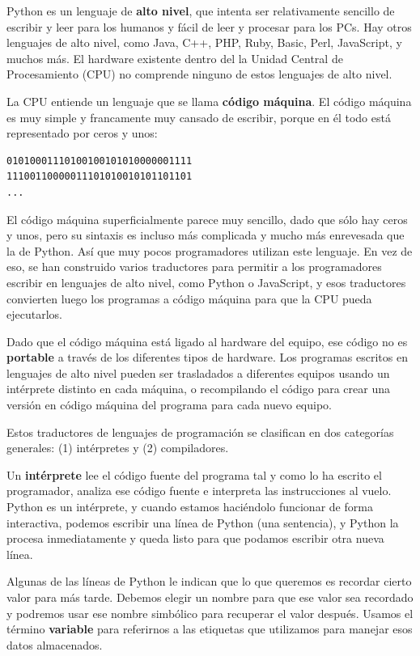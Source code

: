 Python es un lenguaje de {\bf alto nivel}, que intenta ser relativamente
sencillo de escribir y leer para los humanos y fácil de leer y procesar para
los PCs. Hay otros lenguajes de alto nivel, como Java, C++,
PHP, Ruby, Basic, Perl, JavaScript, y muchos más. El hardware existente
dentro del la Unidad Central de Procesamiento (CPU) no comprende
ninguno de estos lenguajes de alto nivel.

La CPU entiende un lenguaje que se llama {\bf código máquina}. El código
máquina es muy simple y francamente muy cansado de escribir, porque
en él todo está representado por ceros y unos:

\beforeverb
\begin{verbatim}
01010001110100100101010000001111
11100110000011101010010101101101
...
\end{verbatim}
\afterverb
%
El código máquina superficialmente parece muy sencillo, dado que sólo hay
ceros y unos, pero su sintaxis es incluso más complicada
y mucho más enrevesada que la de Python. Así que muy pocos programadores
utilizan este lenguaje. En vez de eso, se han construido varios traductores para
permitir a los programadores escribir en lenguajes de alto nivel, como Python
o JavaScript, y esos traductores convierten luego los programas a código máquina
para que la CPU pueda ejecutarlos.

Dado que el código máquina está ligado al hardware del equipo, ese código
no es {\bf portable} a través de los diferentes tipos de hardware. Los programas escritos
en lenguajes de alto nivel pueden ser trasladados a diferentes equipos usando
un intérprete distinto en cada máquina, o recompilando el código para crear
una versión en código máquina del programa para cada nuevo equipo.

Estos traductores de lenguajes de programación se clasifican en dos categorías generales:
(1) intérpretes y (2) compiladores.

Un {\bf intérprete} lee el código fuente del programa tal y como lo ha escrito
el programador, analiza ese código fuente e interpreta las instrucciones al vuelo.
Python es un intérprete, y cuando estamos haciéndolo funcionar de forma interactiva,
podemos escribir una línea de Python (una sentencia), y Python la procesa inmediatamente
y queda listo para que podamos escribir otra nueva línea.

Algunas de las líneas de Python le indican que lo que queremos es recordar cierto
valor para más tarde. Debemos elegir un nombre para que ese valor sea recordado y
podremos usar ese nombre simbólico para recuperar el valor después. Usamos el
término {\bf variable} para referirnos a las etiquetas que utilizamos para manejar esos
datos almacenados.

